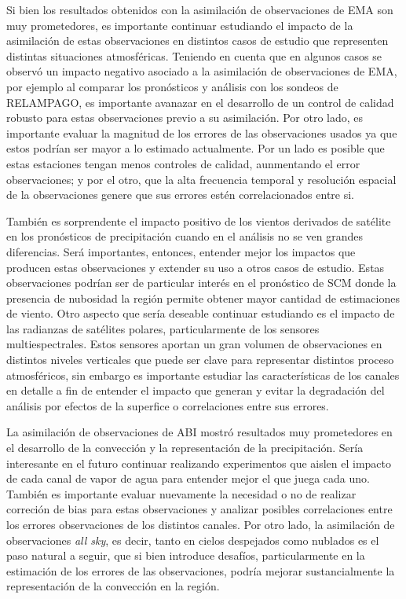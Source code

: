 \documentclass[12pt,oneside,a4paper]{reedthesis}
\begin{document}
Si bien los resultados obtenidos con la asimilación de observaciones de EMA son muy prometedores, es importante continuar estudiando el impacto de la asimilación de estas observaciones en distintos casos de estudio que representen distintas situaciones atmosféricas. Teniendo en cuenta que en algunos casos se observó un impacto negativo asociado a la asimilación de observaciones de EMA, por ejemplo al comparar los pronósticos y análisis con los sondeos de RELAMPAGO, es importante avanazar en el desarrollo de un control de calidad robusto para estas observaciones previo a su asimilación. Por otro lado, es importante evaluar la magnitud de los errores de las observaciones usados ya que estos podrían ser mayor a lo estimado actualmente. Por un lado es posible que estas estaciones tengan menos controles de calidad, aunmentando el error observaciones; y por el otro, que la alta frecuencia temporal y resolución espacial de la observaciones genere que sus errores estén correlacionados entre si.

También es sorprendente el impacto positivo de los vientos derivados de satélite en los pronósticos de precipitación cuando en el análisis no se ven grandes diferencias. Será importantes, entonces, entender mejor los impactos que producen estas observaciones y extender su uso a otros casos de estudio. Estas observaciones podrían ser de particular interés en el pronóstico de SCM donde la presencia de nubosidad la región permite obtener mayor cantidad de estimaciones de viento. Otro aspecto que sería deseable continuar estudiando es el impacto de las radianzas de satélites polares, particularmente de los sensores multiespectrales. Estos sensores aportan un gran volumen de observaciones en distintos niveles verticales que puede ser clave para representar distintos proceso atmosféricos, sin embargo es importante estudiar las características de los canales en detalle a fin de entender el impacto que generan y evitar la degradación del análisis por efectos de la superfice o correlaciones entre sus errores.

La asimilación de observaciones de ABI mostró resultados muy prometedores en el desarrollo de la convección y la representación de la precipitación. Sería interesante en el futuro continuar realizando experimentos que aislen el impacto de cada canal de vapor de agua para entender mejor el que juega cada uno. También es importante evaluar nuevamente la necesidad o no de realizar correción de bias para estas observaciones y analizar posibles correlaciones entre los errores observaciones de los distintos canales. Por otro lado, la asimilación de observaciones \emph{all sky}, es decir, tanto en cielos despejados como nublados es el paso natural a seguir, que si bien introduce desafíos, particularmente en la estimación de los errores de las observaciones, podría mejorar sustancialmente la representación de la convección en la región.
\end{document}
